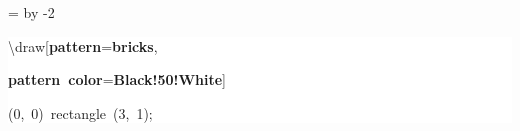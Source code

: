\begingroup
\ttfamily
{}
=\textwidth
\advance{} by -2\fboxsep
\noindent
\colorbox{background}
{%
\parbox{\dimen255}
{%
\rule[-0.5ex]{0pt}{2.5ex}\hspace*{0.0em}\textbackslash{}draw[\textcolor{R}{\textbf{pattern}}=\textcolor{B}{\textbf{bricks}},\\
\rule[-0.5ex]{0pt}{2.5ex}\hspace*{3.0em}\textcolor{R}{\textbf{pattern~color}}=\textcolor{B}{\textbf{Black!50!White}}]\\
\rule[-0.5ex]{0pt}{2.5ex}\hspace*{3.0em}(0,~0)~rectangle~(3,~1);}%
}%
\endgroup
